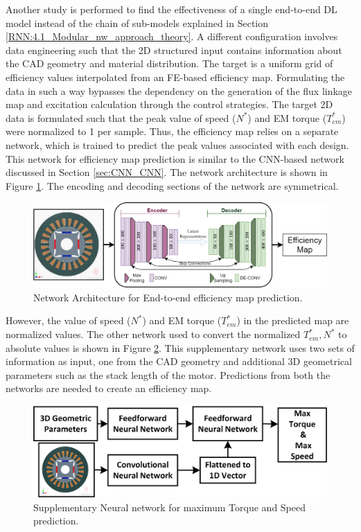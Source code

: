 Another study is performed to find the effectiveness of a single end-to-end DL model instead of the chain of sub-models explained in Section \ref{RNN:4.1_Modular_nw_approach_theory}. A different configuration involves data engineering such that the 2D structured input contains information about the CAD geometry and material distribution. The target is a uniform grid of efficiency values interpolated from an FE-based efficiency map. Formulating the data in such a way bypasses the dependency on the generation of the flux linkage map and excitation calculation through the control strategies. The target 2D data is formulated such that the peak value of speed ($N^*$) and EM torque ($T_{em}^*$) were normalized to 1 per sample. Thus, the efficiency map relies on a separate network, which is trained to predict the peak values associated with each design. This network for efficiency map prediction is similar to the CNN-based network discussed in Section \ref{sec:CNN_CNN}. The network architecture is shown in Figure \ref{fig:CNN_End_to_end}. The encoding and decoding sections of the network are symmetrical. 

\begin{figure}[h!]
    \centering
    \includegraphics[width=\textwidth]{Figures/Chp2_CNN/CNN_End_to_end.png}
    \caption{Network Architecture for End-to-end efficiency map prediction.}
    \label{fig:CNN_End_to_end}
\end{figure}

However, the value of speed ($N^*$) and EM torque ($T_{em}^*$) in the predicted map are normalized values. The other network used to convert the normalized $T^*_{em}, N^*$ to absolute values is shown in Figure \ref{fig:CNN_Function_Max_presentation}. This supplementary network uses two sets of information as input, one from the CAD geometry and additional 3D geometrical parameters such as the stack length of the motor. Predictions from both the networks are needed to create an efficiency map. 

\begin{figure}
    \centering
    \includegraphics[width=\textwidth]{Figures/Chp2_CNN/CNN_Function_Max_presentation.png}
    \caption{Supplementary Neural network for maximum Torque and Speed prediction.}
    \label{fig:CNN_Function_Max_presentation}
\end{figure}

